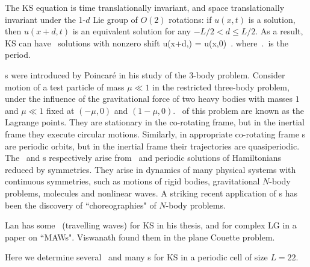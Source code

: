

The KS equation   is time translationally invariant,
and
space translationally invariant
under the 1-$d$ Lie group of $O(2)$ rotations: if
$u(x,t)$ is a solution, then $u(x+d,t)$ is an equivalent
solution for any $-L/2 < d \leq L/2$.
As a result,
KS can have \rpo\ solutions with nonzero shift
\beq
u(x+d,\period{}) = u(x,0)
\,.
where $\period{}$ is the period.


{\Rpo s} were introduced by Poincar\'e in his study of
the 3-body problem.
Consider motion of a test particle of mass
$\mu \ll 1$ in the
restricted three-body problem,
under the
influence of the gravitational force of two heavy bodies with masses $1$ and
$\mu \ll 1$ fixed at $(-\mu,0)$ and $(1-\mu,0)$. \Reqva\ of this problem
are known as the Lagrange points. They are stationary in
the co-rotating frame, but
in the inertial frame they execute circular motions.
Similarly, in appropriate co-rotating frame
{\rpo s} are periodic orbits,
but in the inertial frame their trajectories
are quasiperiodic.
The \reqva\ and \rpo s
respectively arise from
\eqva\ and periodic solutions of Hamiltonians reduced by symmetries.
They arise in dynamics of many physical systems
with continuous symmetries, such as motions of rigid bodies, gravitational
$N$-body problems, molecules and nonlinear waves.
A striking recent application of \rpo s has been the discovery
of ``choreographies" of $N$-body problems.

Lan has some \reqva\ (travelling waves) for KS in his
thesis, %
 and for complex LG in a paper on ``MAWs".
Viswanath %
found them in the plane Couette problem.

Here we determine
several \eqva\ and many \rpo s for
KS in a periodic cell of size $L=22$.
